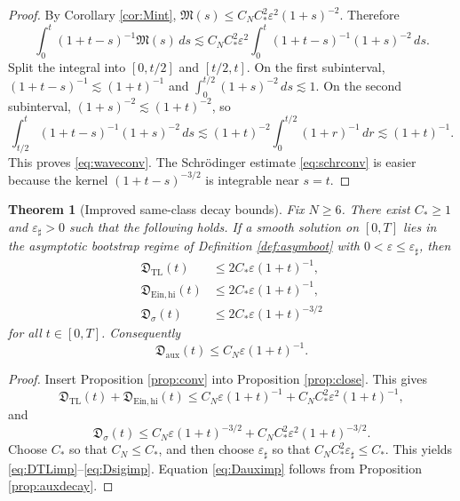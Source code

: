 \documentclass[11pt]{article}
\newtheorem{theorem}{Theorem}
\begin{document}
\begin{proof}
By Corollary \ref{cor:Mint}, \(\mathfrak M(s)\le C_NC_\ast^2\varepsilon^2(1+s)^{-2}\). Therefore
\[
\int_0^t (1+t-s)^{-1}\mathfrak M(s)\,ds
\lesssim
C_NC_\ast^2\varepsilon^2
\int_0^t (1+t-s)^{-1}(1+s)^{-2}\,ds.
\]
Split the integral into \([0,t/2]\) and \([t/2,t]\). On the first subinterval, \((1+t-s)^{-1}\lesssim (1+t)^{-1}\) and \(\int_0^{t/2}(1+s)^{-2}\,ds\lesssim 1\). On the second subinterval, \((1+s)^{-2}\lesssim (1+t)^{-2}\), so
\[
\int_{t/2}^t (1+t-s)^{-1}(1+s)^{-2}\,ds
\lesssim
(1+t)^{-2}\int_0^{t/2}(1+r)^{-1}\,dr
\lesssim
(1+t)^{-1}.
\]
This proves \eqref{eq:waveconv}. The Schr\"odinger estimate \eqref{eq:schrconv} is easier because the kernel \((1+t-s)^{-3/2}\) is integrable near \(s=t\).
\end{proof}

\begin{theorem}[Improved same-class decay bounds]
\label{thm:improve}
Fix \(N\ge 6\). There exist \(C_\ast\ge 1\) and \(\varepsilon_\sharp>0\) such that the following holds. If a smooth solution on \([0,T]\) lies in the asymptotic bootstrap regime of Definition \ref{def:asymboot} with \(0<\varepsilon\le \varepsilon_\sharp\), then
\begin{align}
\mathfrak D_{\mathrm{TL}}(t)
&\le
2C_\ast\varepsilon(1+t)^{-1},
\label{eq:DTLimp}
\\
\mathfrak D_{\mathrm{Ein,hi}}(t)
&\le
2C_\ast\varepsilon(1+t)^{-1},
\label{eq:DEinimp}
\\
\mathfrak D_\sigma(t)
&\le
2C_\ast\varepsilon(1+t)^{-3/2}
\label{eq:Dsigimp}
\end{align}
for all \(t\in[0,T]\). Consequently
\begin{equation}
\mathfrak D_{\mathrm{aux}}(t)\le C_N\varepsilon(1+t)^{-1}.
\label{eq:Dauximp}
\end{equation}
\end{theorem}

\begin{proof}
Insert Proposition \ref{prop:conv} into Proposition \ref{prop:close}. This gives
\[
\mathfrak D_{\mathrm{TL}}(t)
+ \mathfrak D_{\mathrm{Ein,hi}}(t)
\le
C_N\varepsilon(1+t)^{-1}
+ C_NC_\ast^2\varepsilon^2(1+t)^{-1},
\]
and
\[
\mathfrak D_\sigma(t)
\le
C_N\varepsilon(1+t)^{-3/2}
+ C_NC_\ast^2\varepsilon^2(1+t)^{-3/2}.
\]
Choose \(C_\ast\) so that \(C_N\le C_\ast\), and then choose \(\varepsilon_\sharp\) so that \(C_NC_\ast^2\varepsilon_\sharp\le C_\ast\). This yields \eqref{eq:DTLimp}--\eqref{eq:Dsigimp}. Equation \eqref{eq:Dauximp} follows from Proposition \ref{prop:auxdecay}.
\end{proof}
\end{document}
